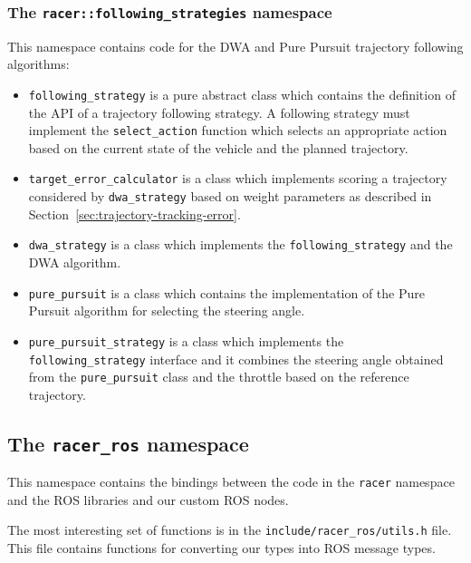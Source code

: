 \subsubsection{The \texttt{racer::following\_strategies} namespace}

This namespace contains code for the \gls{DWA} and Pure Pursuit trajectory following algorithms:

\begin{itemize}
	\item \texttt{following\_strategy} is a pure abstract class which contains the definition of the API of a trajectory following strategy. A following strategy must implement the \texttt{select\_action} function which selects an appropriate action based on the current state of the vehicle and the planned trajectory.
	\item \texttt{target\_error\_calculator} is a class which implements scoring a trajectory considered by \texttt{dwa\_strategy} based on weight parameters as described in Section~\ref{sec:trajectory-tracking-error}.
	\item \texttt{dwa\_strategy} is a class which implements the \texttt{following\_strategy} and the \gls*{DWA} algorithm.
	\item \texttt{pure\_pursuit} is a class which contains the implementation of the Pure Pursuit algorithm for selecting the steering angle.
	\item \texttt{pure\_pursuit\_strategy} is a class which implements the \texttt{following\_strategy} interface and it combines the steering angle obtained from the \texttt{pure\_pursuit} class and the throttle based on the reference trajectory.
\end{itemize}

\subsection{The \texttt{racer\_ros} namespace}

This namespace contains the bindings between the code in the \texttt{racer} namespace and the \gls{ROS} libraries and our custom \gls*{ROS} nodes.

The most interesting set of functions is in the \texttt{include/racer\_ros/utils.h} file. This file contains functions for converting our types into \gls*{ROS} message types.

